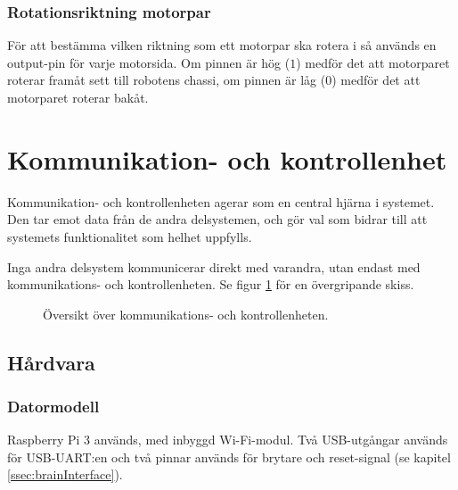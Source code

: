 \documentclass[a4paper,11pt]{article}
\begin{document}
\subsubsection{Rotationsriktning motorpar}
För att bestämma vilken riktning som ett motorpar ska rotera i så används en output-pin för varje motorsida. Om pinnen är hög ($1$) medför det att motorparet roterar framåt sett till robotens chassi, om pinnen är låg ($0$) medför det att motorparet roterar bakåt.

\clearpage
\section{Kommunikation- och kontrollenhet} \label{sec:system3}
Kommunikation- och kontrollenheten agerar som en central hjärna i systemet. Den tar emot data från de andra delsystemen, och gör val som bidrar till att systemets funktionalitet som helhet uppfylls.

Inga andra delsystem kommunicerar direkt med varandra, utan endast med kommunikations- och kontrollenheten. Se figur \ref{fig:unitBrain} för en övergripande skiss.

\begin{figure}[h!]
    \caption{Översikt över kommunikations- och kontrollenheten.  }
    \label{fig:unitBrain}
\end{figure}

\subsection{Hårdvara}

\subsubsection{Datormodell}
Raspberry Pi 3 används, med inbyggd Wi-Fi-modul. Två USB-utgångar används för USB-UART:en och två pinnar används för brytare och reset-signal (se kapitel \ref{ssec:brainInterface}).
\end{document}
